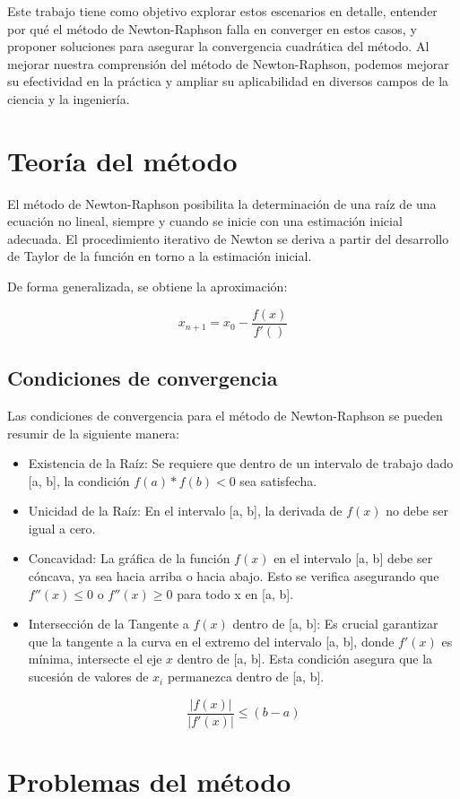 \documentclass[conference]{IEEEtran}
\begin{document}
Este trabajo tiene como objetivo explorar estos escenarios en detalle,
entender por qué el método de Newton-Raphson falla en converger en estos
casos, y proponer soluciones para asegurar la convergencia cuadrática del
método. Al mejorar nuestra comprensión del método de Newton-Raphson, podemos
mejorar su efectividad en la práctica y ampliar su aplicabilidad en diversos
campos de la ciencia y la ingeniería.

\nocite{bolivar2005metodo}

\nocite{canterometodo}

\section{Teoría del método}

El método de Newton-Raphson posibilita la determinación de una raíz de una
ecuación no lineal, siempre y cuando se inicie con una estimación
inicial adecuada. El procedimiento iterativo de Newton se deriva a partir
del desarrollo de Taylor de la función en torno a la estimación inicial.

De forma generalizada, se obtiene la aproximación:

\begin{equation}
	x_{n + 1} = x_0 - \frac{f(x)}{f'()}
\end{equation}

\subsection{Condiciones de convergencia}

Las condiciones de convergencia para el método de Newton-Raphson se pueden
resumir de la siguiente manera:

\begin{itemize}
	\item Existencia de la Raíz: Se requiere que dentro de un intervalo
	      de trabajo dado [a, b], la condición $f(a) * f(b) < 0$ sea satisfecha.

	\item Unicidad de la Raíz:
	      En el intervalo [a, b], la derivada de $f(x)$ no debe ser igual a cero.

	\item Concavidad: La gráfica de la función $f(x)$ en el intervalo [a, b]
	      debe ser cóncava, ya sea hacia arriba o hacia abajo. Esto se verifica
	      asegurando que $f''(x) \leqslant 0$ o $f''(x) \geqslant 0$ para todo x en [a, b].

	\item Intersección de la Tangente a $f(x)$ dentro de [a, b]:
	      Es crucial garantizar que la tangente a la curva en el extremo del
	      intervalo [a, b], donde $f'(x)$ es mínima, intersecte el eje $x$
	      dentro de [a, b]. Esta condición asegura que la sucesión de
	      valores de $x_i$ permanezca dentro de [a, b].

	      \begin{equation*}
		      \frac{\left\lvert f(x) \right\rvert }{\left\lvert f'(x) \right\rvert} \leqslant (b - a)
	      \end{equation*}
\end{itemize}

\section{Problemas del método}




\end{document}
